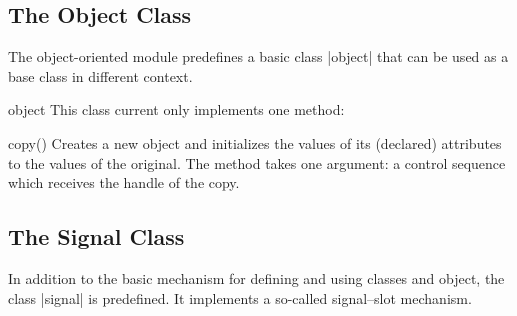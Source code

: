 \subsection{The Object Class}
\label{section-object}

The object-oriented module predefines a basic class |object| that can be used
as a base class in different context.

\begin{ooclass}{object}
    This class current only implements one method:

    \begin{method}{copy()}
        Creates a new object and initializes the values of its (declared)
        attributes to the values of the original. The method takes one
        argument: a control sequence which receives the handle of the copy.
    \end{method}
\end{ooclass}


\subsection{The Signal Class}
\label{section-signals}

In addition to the basic mechanism for defining and using classes and object,
the class |signal| is predefined. It implements a so-called signal--slot
mechanism.

